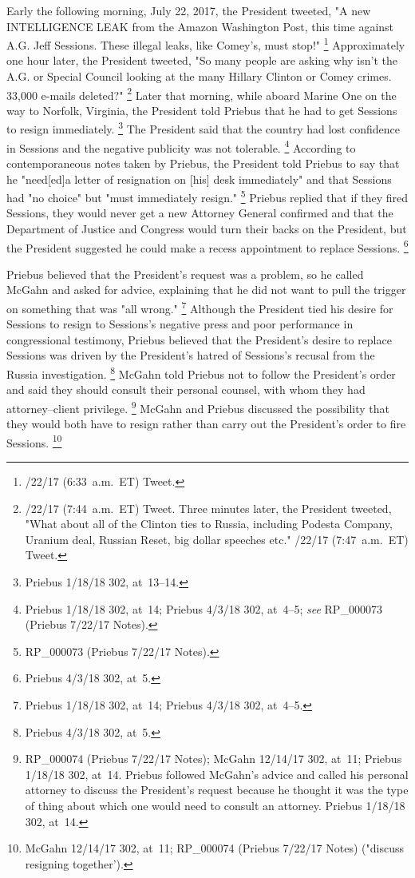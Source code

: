 {Early the following morning, July 22, 2017, the President tweeted, "A new INTELLIGENCE LEAK from the Amazon Washington Post, this time against A.G. Jeff Sessions.
These illegal leaks, like Comey's, must stop!"%
\footnote{/22/17 (6:33~a.m.~ET) Tweet.}
Approximately one hour later, the President tweeted, "So many people are asking why isn't the A.G. or Special Council looking at the many Hillary Clinton or Comey crimes.
33,000 e-mails deleted?"%
\footnote{/22/17 (7:44~a.m.~ET) Tweet.
Three minutes later, the President tweeted, "What about all of the Clinton ties to Russia, including Podesta Company, Uranium deal, Russian Reset, big dollar speeches etc."
/22/17 (7:47~a.m.~ET) Tweet.}
Later that morning, while aboard Marine One on the way to Norfolk, Virginia, the President told Priebus that he had to get Sessions to resign immediately.%
\footnote{Priebus 1/18/18 302, at~13--14.}
The President said that the country had lost confidence in Sessions and the negative publicity was not tolerable.%
\footnote{Priebus 1/18/18 302, at~14;
Priebus 4/3/18 302, at~4--5;
\textit{see} RP\_000073 (Priebus 7/22/17 Notes).}
According to contemporaneous notes taken by Priebus, the President told Priebus to say that he "need[ed]a letter of resignation on [his] desk immediately" and that Sessions had "no choice" but "must immediately resign."%
\footnote{RP\_000073 (Priebus 7/22/17 Notes).}
Priebus replied that if they fired Sessions, they would never get a new Attorney General confirmed and that the Department of Justice and Congress would turn their backs on the President, but the President suggested he could make a recess appointment to replace Sessions.%
\footnote{Priebus 4/3/18 302, at~5.}

Priebus believed that the President's request was a problem, so he called McGahn and asked for advice, explaining that he did not want to pull the trigger on something that was "all wrong."%
\footnote{Priebus 1/18/18 302, at~14;
Priebus 4/3/18 302, at~4--5.}
Although the President tied his desire for Sessions to resign to Sessions's negative press and poor performance in congressional testimony, Priebus believed that the President's desire to replace Sessions was driven by the President's hatred of Sessions's recusal from the Russia investigation.%
\footnote{Priebus 4/3/18 302, at~5.}
McGahn told Priebus not to follow the President's order and said they should consult their personal counsel, with whom they had attorney--client privilege.%
\footnote{RP\_000074 (Priebus 7/22/17 Notes);
McGahn 12/14/17 302, at~11;
Priebus 1/18/18 302, at~14.
Priebus followed McGahn's advice and called his personal attorney to discuss the President's request because he thought it was the type of thing about which one would need to consult an attorney.
Priebus 1/18/18 302, at~14.}
McGahn and Priebus discussed the possibility that they would both have to resign rather than carry out the President's order to fire Sessions.%
\footnote{McGahn 12/14/17 302, at~11;
RP\_000074 (Priebus 7/22/17 Notes) ("discuss resigning together').}

}
